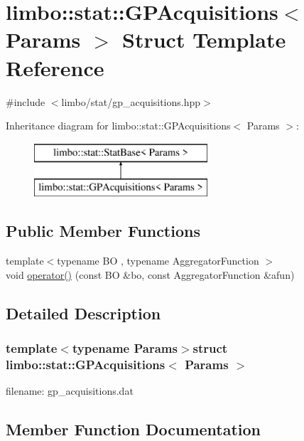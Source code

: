 \hypertarget{structlimbo_1_1stat_1_1_g_p_acquisitions}{}\section{limbo\+:\+:stat\+:\+:G\+P\+Acquisitions$<$ Params $>$ Struct Template Reference}
\label{structlimbo_1_1stat_1_1_g_p_acquisitions}


{\ttfamily \#include $<$limbo/stat/gp\+\_\+acquisitions.\+hpp$>$}

Inheritance diagram for limbo\+:\+:stat\+:\+:G\+P\+Acquisitions$<$ Params $>$\+:\begin{figure}[H]
\begin{center}
\leavevmode
\includegraphics[height=2.000000cm]{structlimbo_1_1stat_1_1_g_p_acquisitions}
\end{center}
\end{figure}
\subsection*{Public Member Functions}
\begin{DoxyCompactItemize}
\item 
{\footnotesize template$<$typename B\+O , typename Aggregator\+Function $>$ }\\void \hyperlink{structlimbo_1_1stat_1_1_g_p_acquisitions_ac671f5f138d1545bd339068ec5fe4824}{operator()} (const B\+O \&bo, const Aggregator\+Function \&afun)
\end{DoxyCompactItemize}


\subsection{Detailed Description}
\subsubsection*{template$<$typename Params$>$struct limbo\+::stat\+::\+G\+P\+Acquisitions$<$ Params $>$}

filename\+: {\ttfamily gp\+\_\+acquisitions.\+dat} 

\subsection{Member Function Documentation}
\hypertarget{structlimbo_1_1stat_1_1_g_p_acquisitions_ac671f5f138d1545bd339068ec5fe4824}{}
